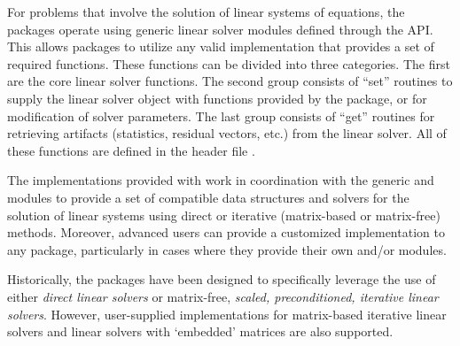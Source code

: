 %
For problems that involve the solution of linear systems of equations,
the {\sundials} packages operate using generic linear solver modules
defined through the {\sunlinsol} API.  This allows {\sundials}
packages to utilize any valid {\sunlinsol} implementation that provides
a set of required functions.  These functions can be divided into
three categories.  The first are the core linear solver functions.  The
second group consists of ``set'' routines to supply the linear solver object
with functions provided by the {\sundials} package, or for modification
of solver parameters.  The last group consists of ``get'' routines for
retrieving artifacts (statistics, residual vectors, etc.) from the
linear solver.  All of these functions are defined in the header file
.

The implementations provided with {\sundials} work in coordination
with the {\sundials} generic {\nvector} and {\sunmatrix} modules to
provide a set of compatible data structures and solvers for the
solution of linear systems using direct or iterative (matrix-based or matrix-free)
methods.  Moreover, advanced users can provide a customized
 implementation to any {\sundials} package,
particularly in cases where they provide their own {\nvector} and/or
{\sunmatrix} modules.

Historically, the {\sundials} packages have been designed to specifically
leverage the use of either \emph{direct linear solvers} or matrix-free,
\emph{scaled, preconditioned, iterative linear solvers}.  However, user-supplied
implementations for matrix-based iterative linear solvers and linear solvers
with `embedded' matrices are also supported.

